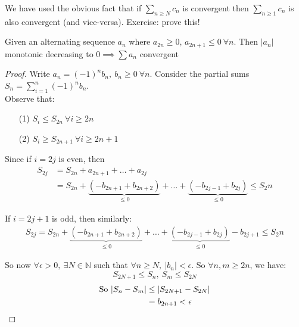 \documentclass[10pt,twoside]{scrartcl}
\begin{document}
We have used the obvious fact that if $\sum_{n \geq N} c_n$ is convergent then $\sum_{n \geq 1} c_n$ is also convergent (and vice-versa). Exercise: prove this!\\

\begin{theorem}
Given an alternating sequence $a_n$ where $a_{2n} \geq 0$, $a_{2n+1} \leq 0~ \forall n$. Then $|a_n|$ monotonic decreasing to $0 \implies \sum a_n$ convergent
\end{theorem}

\begin{proof}
Write $a_n = (-1)^nb_n,~b_n\geq 0 ~\forall n	$. Consider the partial sums $S_n = \sum_{i=1}^{n} (-1)^nb_n$.\\

  Observe that: \begin{enumerate}
 \item[(1)]$S_i \leq S_{2n}~\forall i \geq 2n$
 \item[(2)]$S_i \geq S_{2n+1}~\forall i\geq 2n+1$
 \end{enumerate}
 Since if $i=2j$ is even, then
  \begin{align*}
	S_{2j} &= S_{2n} + a_{2n+1} + \dots + a_{2j}\\ 
	&= S_{2n} + \underbrace{(-b_{2n+1} + b_{2n+2})}_{\leq 0} + \dots + \underbrace{(-b_{2j-1} + b_{2j})}_{\leq 0} \leq S_2n
\end{align*}

 
  If $i= 2j+1$ is odd, then similarly:
   \begin{align*}
	S_{2j} = S_{2n} + \underbrace{(-b_{2n+1} + b_{2n+2})}_{\leq 0} + \dots + \underbrace{(-b_{2j-1} + b_{2j})}_{\leq 0} - b_{2j+1} \leq S_2n
\end{align*}

  
 So now $\forall \epsilon >0,~ \exists N \in \mathbb{N}$ such that $\forall n \geq N,~|b_n| < \epsilon$. So $\forall n,m\geq 2n$, we have: \[S_{2N+1} \leq S_n,~S_m \leq S_{2N}\] 
 \begin{align*}\text{So } |S_n - S_m| &\leq |S_{2N+1} - S_{2N}|\\
 &= b_{2n+1} < \epsilon	\qedhere
\end{align*}
\end{proof}\vsp
\end{document}
